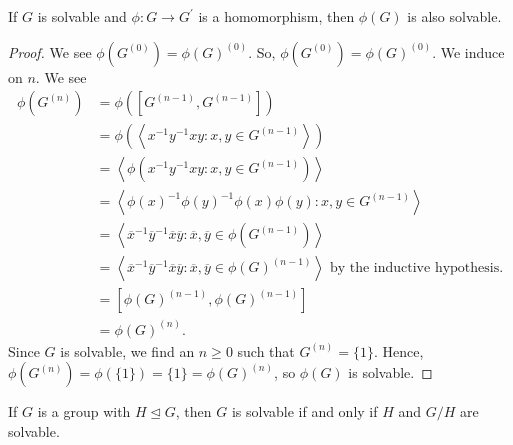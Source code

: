 \begin{theorem}
	If \(G\) is solvable and \(\phi: G \to G^{\prime}\) is a homomorphism, then \(\phi\left( G \right) \) is also solvable.
\end{theorem}
\begin{proof}
We see \(\phi\left( G^{\left( 0 \right) } \right) = \phi\left( G \right) ^{\left( 0 \right) } \). So, \(\phi\left( G^{\left(  0\right) } \right) = \phi\left( G \right) ^{\left( 0 \right) } \). We induce on \(n\). We see \begin{align*}\phi\left( G^{\left( n \right) } \right) &= \phi \left( \left[ G^{\left( n-1 \right) }, G^{\left( n-1 \right) } \right]  \right)\\
&= \phi\left( \left<x^{-1}y^{-1}xy : x, y \in G^{\left( n-1 \right) } \right>  \right)  \\
&= \left<\phi\left( x^{-1}y^{-1}xy : x, y \in G^{\left( n-1 \right) } \right)  \right>  \\
&= \left< \phi\left( x \right) ^{-1} \phi\left( y \right) ^{-1} \phi\left( x \right) \phi\left( y \right)  : x, y \in G^{\left( n-1 \right) } \right> \\
&= \left< \overline{x}^{-1} \overline{y}^{-1} \overline{x} \overline{y} : \overline{x}, \overline{y} \in \phi\left( G^{\left( n-1 \right) } \right) \right>  \\
&= \left<\overline{x}^{-1}\overline{y}^{-1}\overline{x}\overline{y} : \overline{x}, \overline{y} \in\phi \left( G \right) ^{\left( n-1 \right) } \right> \text{ by the inductive hypothesis.}\\
&= \left[ \phi\left( G \right) ^{\left( n-1 \right) }, \phi\left( G \right) ^{\left( n-1 \right) } \right]  \\
&= \phi\left( G \right)^{\left( n \right) } .
\end{align*}
Since \(G\) is solvable, we find an \(n \ge 0\) such that \(G^{\left( n \right) } = \{1\} \). Hence, \(\phi\left( G^{\left( n \right) } \right) = \phi\left( \{1\}  \right) = \{1\}  = \phi\left( G \right) ^{\left( n \right) }  \), so \(\phi\left( G \right) \) is solvable.
\end{proof}
\begin{theorem}
	If \(G\) is a  group with \(H \trianglelefteq G\), then \(G\) is solvable if and only if \(H\) and \(G / H\) are solvable.
\end{theorem}
